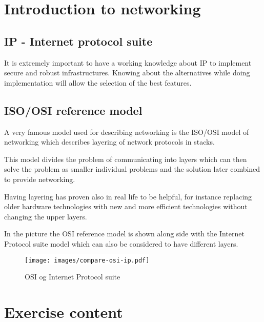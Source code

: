 \documentclass[a4paper,11pt,notitlepage]{report}
\begin{document}


\chapter*{\color{titlecolor}Introduction to networking}
\label{chap:intro}

\section*{\color{titlecolor}IP - Internet protocol suite}

It is extremely important to have a working knowledge about IP to implement
secure and robust infrastructures. Knowing about the alternatives while doing
implementation will allow the selection of the best features.

\section*{\color{titlecolor}ISO/OSI reference model}
A very famous model used for describing networking is the ISO/OSI model
of networking which describes layering of network protocols in stacks.

This model divides the problem of communicating into layers which can
then solve the problem as smaller individual problems and the solution
later combined to provide networking.

Having layering has proven also in real life to be helpful, for instance
replacing older hardware technologies with new and more efficient technologies
without changing the upper layers.

In the picture the OSI reference model is shown along side with
the Internet Protocol suite model which can also be considered to have different layers.


\begin{figure}[H]
\label{fig:osi}
\begin{center}
\colorbox{white}{\texttt{[image: images/compare-osi-ip.pdf]}}
\end{center}
\caption{OSI og Internet Protocol suite}
\end{figure}


\chapter*{\color{titlecolor}Exercise content}
\end{document}
